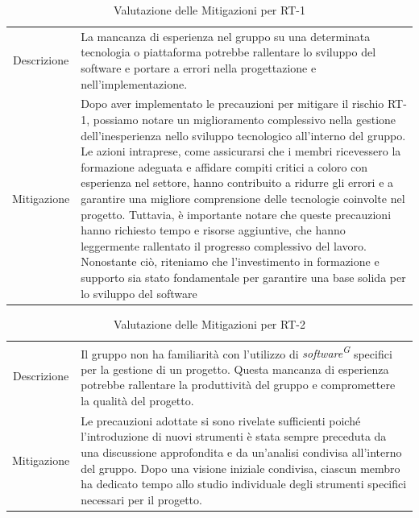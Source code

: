\documentclass[5pt]{article}
\begin{document}
\begin{table}[H]
    \centering
    \begin{tabular}{|c|p{10cm}|}
        \hline
        \rowcolor{teal!50}
        \multicolumn{2}{|c|}{\textbf{RT-1: Inesperienza nello sviluppo tecnologico}} \\ 
        \hline
        Descrizione & La mancanza di esperienza nel gruppo su una determinata tecnologia o piattaforma potrebbe rallentare lo sviluppo del software e portare a errori nella progettazione e nell'implementazione. \\ \hline
        Mitigazione & Dopo aver implementato le precauzioni per mitigare il rischio RT-1, possiamo notare un miglioramento complessivo nella gestione dell'inesperienza nello sviluppo tecnologico all'interno del gruppo. Le azioni intraprese, come assicurarsi che i membri ricevessero la formazione adeguata e affidare compiti critici a coloro con esperienza nel settore, hanno contribuito a ridurre gli errori e a garantire una migliore comprensione delle tecnologie coinvolte nel progetto. Tuttavia, è importante notare che queste precauzioni hanno richiesto tempo e risorse aggiuntive, che hanno leggermente rallentato il progresso complessivo del lavoro. Nonostante ciò, riteniamo che l'investimento in formazione e supporto sia stato fondamentale per garantire una base solida per lo sviluppo del software \\ \hline
    \end{tabular}
    \caption{Valutazione delle Mitigazioni per RT-1}
\end{table}

\begin{table}[H]
    \centering
    \begin{tabular}{|c|p{10cm}|}
        \hline
        \rowcolor{teal!50}
        \multicolumn{2}{|c|}{\textbf{RT-2: Inesperienza strumenti \textit{software}}} \\ 
        \hline
        Descrizione & Il gruppo non ha familiarità con l'utilizzo di \textit{software\textsuperscript{G}} specifici per la gestione di un progetto. Questa mancanza di esperienza potrebbe rallentare la produttività del gruppo e compromettere la qualità del progetto. \\ \hline
        Mitigazione & Le precauzioni adottate si sono rivelate sufficienti poiché l'introduzione di nuovi strumenti è stata sempre preceduta da una discussione approfondita e da un'analisi condivisa all'interno del gruppo. Dopo una visione iniziale condivisa, ciascun membro ha dedicato tempo allo studio individuale degli strumenti specifici necessari per il progetto. \\ \hline
    \end{tabular}
    \caption{Valutazione delle Mitigazioni per RT-2}
\end{table}
\end{document}
